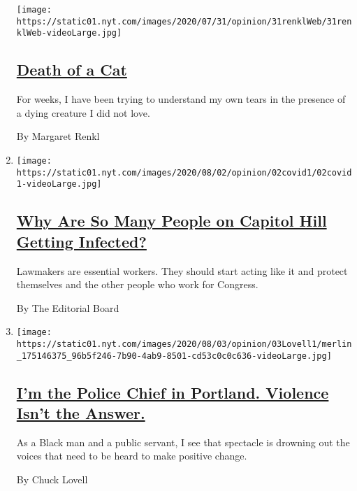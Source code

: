 \begin{enumerate}
  \texttt{[image: https://static01.nyt.com/images/2020/07/31/opinion/31renklWeb/31renklWeb-videoLarge.jpg]}

  \hypertarget{death-of-a-cat}{%
  \subsection{\texorpdfstring{\href{/2020/08/03/opinion/feral-cat-dying.html}{Death
  of a Cat}}{Death of a Cat}}\label{death-of-a-cat}}

  For weeks, I have been trying to understand my own tears in the
  presence of a dying creature I did not love.

  By Margaret Renkl
\item
  \texttt{[image: https://static01.nyt.com/images/2020/08/02/opinion/02covid1/02covid1-videoLarge.jpg]}

  \hypertarget{why-are-so-many-people-on-capitol-hill-getting-infected}{%
  \subsection{\texorpdfstring{\href{/2020/08/02/opinion/coronavirus-gohmert-congress-testing.html}{Why
  Are So Many People on Capitol Hill Getting
  Infected?}}{Why Are So Many People on Capitol Hill Getting Infected?}}\label{why-are-so-many-people-on-capitol-hill-getting-infected}}

  Lawmakers are essential workers. They should start acting like it and
  protect themselves and the other people who work for Congress.

  By The Editorial Board
\item
  \texttt{[image: https://static01.nyt.com/images/2020/08/03/opinion/03Lovell1/merlin\_175146375\_96b5f246-7b90-4ab9-8501-cd53c0c0c636-videoLarge.jpg]}

  \hypertarget{im-the-police-chief-in-portland-violence-isnt-the-answer}{%
  \subsection{\texorpdfstring{\href{/2020/08/03/opinion/portland-protests-police-chief.html}{I'm
  the Police Chief in Portland. Violence Isn't the
  Answer.}}{I'm the Police Chief in Portland. Violence Isn't the Answer.}}\label{im-the-police-chief-in-portland-violence-isnt-the-answer}}

  As a Black man and a public servant, I see that spectacle is drowning
  out the voices that need to be heard to make positive change.

  By Chuck Lovell
\end{enumerate}

